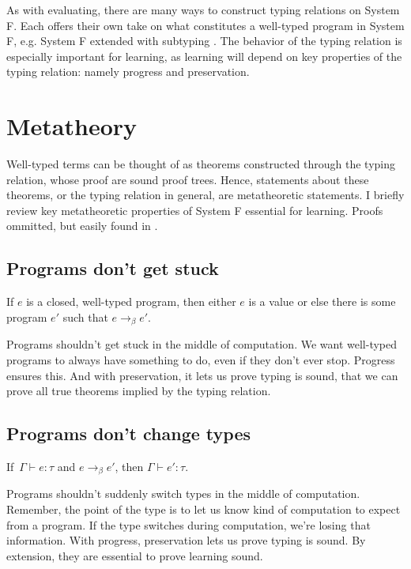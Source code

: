 As with evaluating, there are many ways to construct typing relations on System F. Each offers their own take on what constitutes a well-typed program in System F, e.g. System F extended with subtyping \cite{cardelli1991extension}. The behavior of the typing relation is especially important for learning, as learning will depend on key properties of the typing relation: namely progress and preservation.

\section{Metatheory}
Well-typed terms can be thought of as theorems constructed through the typing relation, whose proof are sound proof trees. Hence, statements about these theorems, or the typing relation in general, are metatheoretic statements. I briefly review key metatheoretic properties of System F essential for learning. Proofs ommitted, but easily found in \cite{girard1989proofs}.
\subsection{Programs don't get stuck}
\begin{theorem}
If $e$ is a closed, well-typed program, then either $e$ is a value or else there is some program $e'$ such that $e \to_\beta e'$.
\label{progress-typing}
\end{theorem}

Programs shouldn't get stuck in the middle of computation. We want well-typed programs to always have something to do, even if they don't ever stop. Progress ensures this. And with preservation, it lets us prove typing is sound, that we can prove all true theorems implied by the typing relation.
\subsection{Programs don't change types}
\begin{theorem}
If $\,\Gamma \vdash e : \tau$ and $e \to_\beta e'$, then $\Gamma \vdash e' : \tau$.
\label{preservation-typing}
\end{theorem}

Programs shouldn't suddenly switch types in the middle of computation. Remember, the point of the type is to let us know kind of computation to expect from a program. If the type switches during computation, we're losing that information. With progress, preservation lets us prove typing is sound. By extension, they are essential to prove learning sound.

